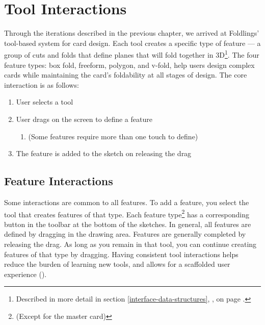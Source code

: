 \section{Tool Interactions}\label{tool-interactions}

Through the iterations described in the previous chapter, we arrived at
Foldlings' tool-based system for card design. Each tool creates a
specific type of feature --- a group of cuts and folds that define
planes that will fold together in 3D\footnote{Described in more detail
  in section \ref{interface-data-structures},
  , on page
  \pageref{interface-data-structures}.}. The four feature types: box
fold, freeform, polygon, and v-fold, help users design complex cards
while maintaining the card's foldability at all stages of design. The
core interaction is as follows:

\begin{enumerate}
\def\labelenumi{\arabic{enumi}.}
\itemsep1pt\parskip0pt
\item
  User selects a tool
\item
  User drags on the screen to define a feature

  \begin{enumerate}
  \def\labelenumii{\alph{enumii}.}
  \itemsep1pt\parskip0pt
  \item
    (Some features require more than one touch to define)
  \end{enumerate}
\item
  The feature is added to the sketch on releasing the drag
\end{enumerate}

\subsection{Feature Interactions}\label{feature-interactions}

Some interactions are common to all features. To add a feature, you
select the tool that creates features of that type. Each feature
type\footnote{(Except for the master card)} has a corresponding button
in the toolbar at the bottom of the sketches. In general, all features
are defined by dragging in the drawing area. Features are generally
completed by releasing the drag. As long as you remain in that tool, you
can continue creating features of that type by dragging. Having
consistent tool interactions helps reduce the burden of learning new
tools, and allows for a scaffolded user experience
(\citet{wood2001scaffolding}).

